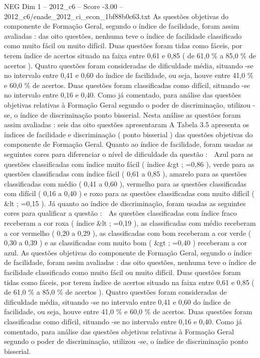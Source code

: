 \begin{textsample}{NEG Dim 1 – 2012\_c6 – Score -3.00 – 2012\_c6/enade\_2012\_ci\_econ\_1bf88b0c63.txt}
As questões objetivas do componente de Formação Geral, segundo o índice de facilidade, foram assim avaliadas : das oito questões, nenhuma teve o índice de facilidade classificado como muito fácil ou muito difícil.
Duas questões foram tidas como fáceis, por terem índice de acertos situado na faixa entre 0,61 e 0,85 ( de 61,0 \% a 85,0 \% de acertos ).
Quatro questões foram consideradas de dificuldade média, situando -se no intervalo entre 0,41 e 0,60 do índice de facilidade, ou seja, houve entre 41,0 \% e 60,0 \% de acertos.
Duas questões foram classificadas como difícil, situando -se no intervalo entre 0,16 e 0,40.
Como já comentado, para análise das questões objetivas relativas à Formação Geral segundo o poder de discriminação, utilizou -se, o índice de discriminação ponto bisserial.
Nesta análise as questões foram assim avaliadas : seis das oito questões apresentaram A Tabela 3.5 apresenta os índices de facilidade e discriminação ( ponto bisserial ) das questões objetivas do componente de Formação Geral.
Quanto ao índice de facilidade, foram usadas as seguintes cores para diferenciar o nível de dificuldade da questão :  Azul para as questões classificadas com índice muito fácil ( índice \&gt ; =0,86 ), verde para as questões classificadas com índice fácil ( 0,61 a 0,85 ), amarelo para as questões classificadas com médio ( 0,41 a 0,60 ), vermelho para as questões classificadas com difícil ( 0,16 a 0,40 ) e roxo para as questões classificadas com muito difícil ( \&lt ; =0,15 ).
Já quanto ao índice de discriminação, foram usadas as seguintes cores para qualificar a questão :  As questões classificadas com índice fraco receberam a cor roxa ( índice \&lt ; =0,19 ), as classificadas com médio receberam a cor vermelho ( 0,20 a 0,29 ), as classificadas com bom receberam a cor verde ( 0,30 a 0,39 ) e as classificadas com muito bom ( \&gt ; =0,40 ) receberam a cor azul.
As questões objetivas do componente de Formação Geral, segundo o índice de facilidade, foram assim avaliadas : das oito questões, nenhuma teve o índice de facilidade classificado como muito fácil ou muito difícil.
Duas questões foram tidas como fáceis, por terem índice de acertos situado na faixa entre 0,61 e 0,85 ( de 61,0 \% a 85,0 \% de acertos ).
Quatro questões foram consideradas de dificuldade média, situando -se no intervalo entre 0,41 e 0,60 do índice de facilidade, ou seja, houve entre 41,0 \% e 60,0 \% de acertos.
Duas questões foram classificadas como difícil, situando -se no intervalo entre 0,16 e 0,40.
Como já comentado, para análise das questões objetivas relativas à Formação Geral segundo o poder de discriminação, utilizou -se, o índice de discriminação ponto bisserial.

\end{textsample}
